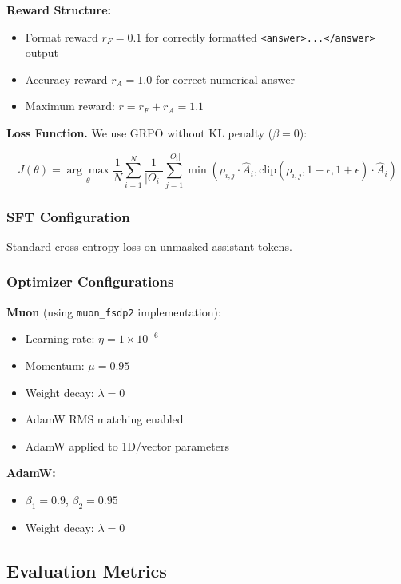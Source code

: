 \documentclass[11pt]{article}
\begin{document}
\textbf{Reward Structure:}
\begin{itemize}
    \item Format reward $r_F = 0.1$ for correctly formatted \texttt{<answer>...</answer>} output
    \item Accuracy reward $r_A = 1.0$ for correct numerical answer
    \item Maximum reward: $r = r_F + r_A = 1.1$
\end{itemize}

\textbf{Loss Function.} We use GRPO without KL penalty ($\beta = 0$):

\begin{equation}
J(\theta) = \underset{\theta}{\arg\max} \frac{1}{N} \sum_{i=1}^{N} \frac{1}{|O_i|} \sum_{j=1}^{|O_i|} \min\left(\rho_{i,j} \cdot \hat{A}_{i}, \text{clip}(\rho_{i,j}, 1-\epsilon, 1+\epsilon) \cdot \hat{A}_{i}\right)
\end{equation}

\subsubsection{SFT Configuration}

Standard cross-entropy loss on unmasked assistant tokens.

\subsubsection{Optimizer Configurations}

\textbf{Muon} (using \texttt{muon\_fsdp2} implementation):
\begin{itemize}
    \item Learning rate: $\eta = 1 \times 10^{-6}$
    \item Momentum: $\mu = 0.95$
    \item Weight decay: $\lambda = 0$
    \item AdamW RMS matching enabled
    \item AdamW applied to 1D/vector parameters
\end{itemize}

\textbf{AdamW:}
\begin{itemize}
    \item $\beta_1 = 0.9$, $\beta_2 = 0.95$
    \item Weight decay: $\lambda = 0$
\end{itemize}

\subsection{Evaluation Metrics}
\end{document}
